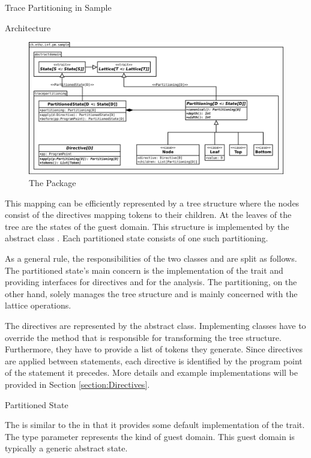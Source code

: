 \begin{chapter}{Trace Partitioning in Sample}
\begin{section}{Architecture}
		\begin{figure}
			\includegraphics[width=\textwidth]{Diagrams/tracepartitioning.png}
			\caption{The  Package}
			\label{figure:tracepartitioning}
		\end{figure}

		This mapping can be efficiently represented by a tree structure where the nodes consist of the directives mapping tokens to their children. At the leaves of the tree are the states of the guest domain. This structure is implemented by the abstract class . Each partitioned state consists of one such partitioning.

		As a general rule, the responsibilities of the two classes  and  are split as follows. The partitioned state's main concern is the implementation of the  trait and providing interfaces for directives and for the analysis. The partitioning, on the other hand, solely manages the tree structure and is mainly concerned with the lattice operations.

		The directives are represented by the abstract  class. Implementing classes have to override the  method that is responsible for transforming the tree structure. Furthermore, they have to provide a list of tokens they generate. Since directives are applied between statements, each directive is identified by the program point of the statement it precedes. More details and example implementations will be provided in Section \ref{section:Directives}. 


		\begin{subsection}{Partitioned State}
			\label{subsection:PartitionedState}

			The  is similar to the  in that it provides some default implementation of the  trait. The type parameter  represents the kind of guest domain. This guest domain is typically a generic abstract state.


\end{subsection}
\end{section}
\end{chapter}
